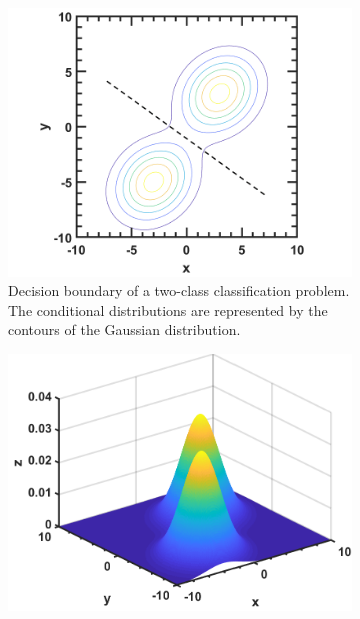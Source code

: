 \begin{refsection}
\begin{figure}[H]
	\centering
	\begin{subfigure}[t]{0.45\textwidth}
		\centering
		\includegraphics[width=1\linewidth]{../figures/statisticalLearning/linearModelClassification/linearGaussianDiscriminateDecisionBoundaryDemo2DOneOverlay}
		\caption{Decision boundary of a two-class classification problem. The conditional distributions are represented by the contours of the Gaussian distribution.}
	\end{subfigure}\quad
	\begin{subfigure}[t]{0.45\textwidth}
		\centering
		\includegraphics[width=1\linewidth]{../figures/statisticalLearning/linearModelClassification/linearGaussianDiscriminateDecisionBoundaryDemo3DOne}

\end{subfigure}
\end{figure}
\end{refsection}
